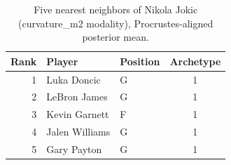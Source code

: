 \begin{table}[htbp]
  \centering\small
  \begin{tabular}{rllc}
    \toprule
    Rank & Player & Position & Archetype \\
    \midrule
    1 & Luka Doncic & G & 1 \\
    2 & LeBron James & G & 1 \\
    3 & Kevin Garnett & F & 1 \\
    4 & Jalen Williams & G & 1 \\
    5 & Gary Payton & G & 1 \\
    \bottomrule
  \end{tabular}
  \caption{Five nearest neighbors of Nikola Jokic (curvature_m2 modality), Procrustes-aligned posterior mean.}
  \label{tab:Nikola_Jokic_neighbors_curvature_m2}
\end{table}

